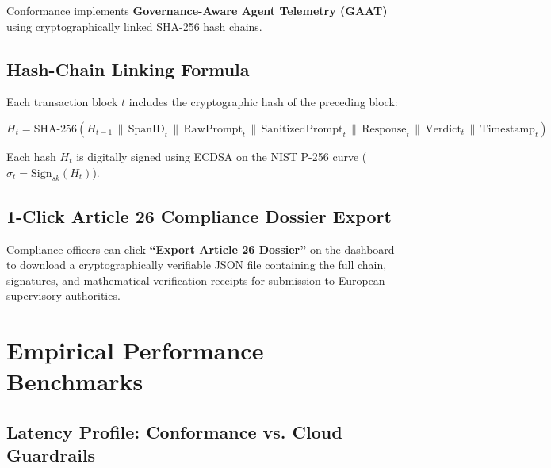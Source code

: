 \documentclass[11pt,a4paper]{article}
\begin{document}
Conformance implements \textbf{Governance-Aware Agent Telemetry (GAAT)} using cryptographically linked SHA-256 hash chains.

\subsection{Hash-Chain Linking Formula}
Each transaction block $t$ includes the cryptographic hash of the preceding block:

\begin{equation}
    H_t = \text{SHA-256}\left( H_{t-1} \,\|\, \text{SpanID}_t \,\|\, \text{RawPrompt}_t \,\|\, \text{SanitizedPrompt}_t \,\|\, \text{Response}_t \,\|\, \text{Verdict}_t \,\|\, \text{Timestamp}_t \right)
\end{equation}

Each hash $H_t$ is digitally signed using ECDSA on the NIST P-256 curve ($\sigma_t = \text{Sign}_{sk}(H_t)$).

\subsection{1-Click Article 26 Compliance Dossier Export}
Compliance officers can click \textbf{``Export Article 26 Dossier''} on the dashboard to download a cryptographically verifiable JSON file containing the full chain, signatures, and mathematical verification receipts for submission to European supervisory authorities.

\section{Empirical Performance Benchmarks}
\label{sec:benchmarks}

\subsection{Latency Profile: Conformance vs. Cloud Guardrails}
\end{document}
